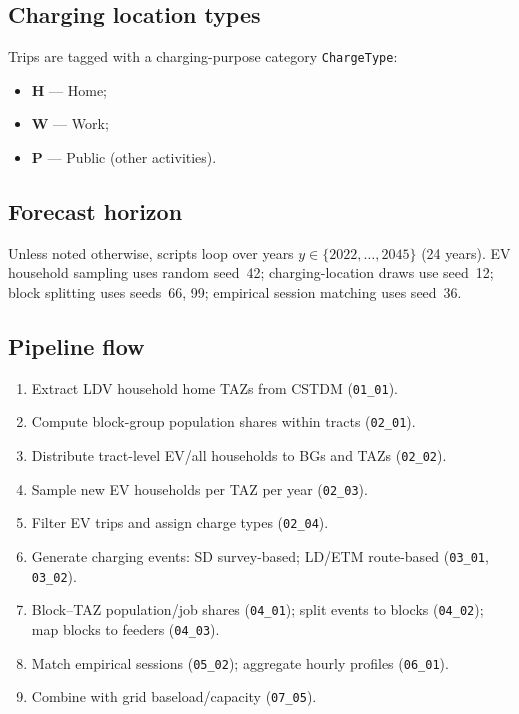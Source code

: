 \documentclass[11pt,a4paper]{article}
\begin{document}
\subsection{Charging location types}

Trips are tagged with a charging-purpose category \texttt{ChargeType}:
\begin{itemize}[noitemsep]
  \item \textbf{H} --- Home;
  \item \textbf{W} --- Work;
  \item \textbf{P} --- Public (other activities).
\end{itemize}

\subsection{Forecast horizon}

Unless noted otherwise, scripts loop over years $y \in \{2022,\ldots,2045\}$ (24 years). EV household sampling uses random seed~42; charging-location draws use seed~12; block splitting uses seeds~66, 99; empirical session matching uses seed~36.

\subsection{Pipeline flow}

\begin{enumerate}[label=\textbf{Stage \arabic*:}, leftmargin=*]
  \item Extract LDV household home TAZs from CSTDM (\texttt{01\_01}).
  \item Compute block-group population shares within tracts (\texttt{02\_01}).
  \item Distribute tract-level EV/all households to BGs and TAZs (\texttt{02\_02}).
  \item Sample new EV households per TAZ per year (\texttt{02\_03}).
  \item Filter EV trips and assign charge types (\texttt{02\_04}).
  \item Generate charging events: SD survey-based; LD/ETM route-based (\texttt{03\_01}, \texttt{03\_02}).
  \item Block--TAZ population/job shares (\texttt{04\_01}); split events to blocks (\texttt{04\_02}); map blocks to feeders (\texttt{04\_03}).
  \item Match empirical sessions (\texttt{05\_02}); aggregate hourly profiles (\texttt{06\_01}).
  \item Combine with grid baseload/capacity (\texttt{07\_05}).
\end{enumerate}
\end{document}
